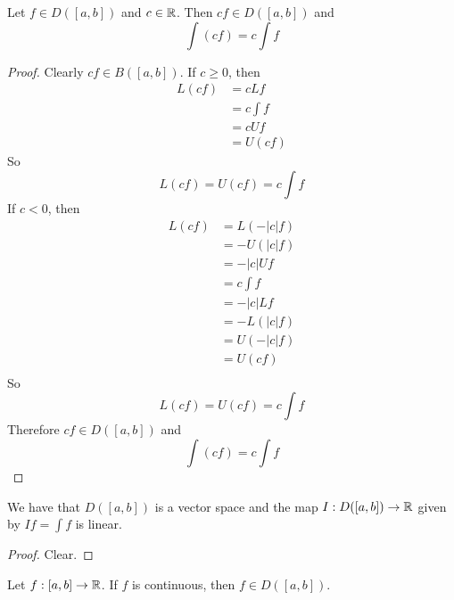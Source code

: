 \documentclass{book}
\begin{document}
	\begin{ex}  
		Let $f \in D([a,b])$ and $c \in \mathbb{R}$. Then $cf \in D([a,b])$ and $$\int (cf) = c \int f $$
	\end{ex}

	\begin{proof}
		Clearly $cf \in B([a,b])$. If $c \geq 0$, then 
		\begin{align*}
			L (cf) 
			&= c Lf \\
			&= c \int f \\
			&= c Uf \\
			&= U(cf)
		\end{align*} 
		So $$L(cf) = U(cf) = c \int f$$ If $c <0$, then 
		\begin{align*}
			L (cf) 
			&= L(-|c| f) \\
			&= -U(|c|f) \\
			&= - |c|Uf \\
			&= c \int f \\
			&= -|c| L f \\
			&= - L(|c|f) \\
			&= U(-|c|f) \\
			&= U (c f) \\
		\end{align*} 
		So $$L(cf) = U(cf) = c \int f$$ Therefore $cf \in D([a,b])$ and $$\int (cf) = c \int f$$
	\end{proof}

	\begin{cor}
		We have that $D([a,b])$ is a vector space and the map $I: D([a,b]) \rightarrow \mathbb{R}$ given by $If = \int f$ is linear.
	\end{cor}

	\begin{proof}
		Clear.
	\end{proof}

	\begin{ex}  
		Let $f:[a,b] \rightarrow \mathbb{R}$. If $f$ is continuous, then $f \in D([a,b])$. 
	\end{ex}
\end{document}
